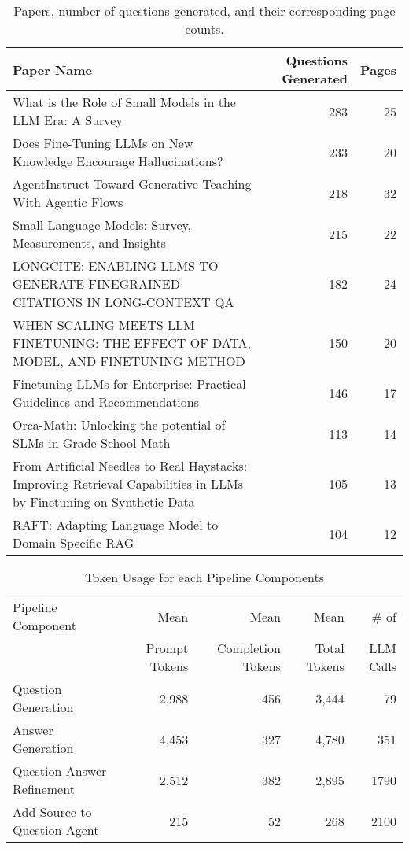 \begin{table}[t]
   \centering
   \caption{Papers, number of questions generated, and their corresponding page counts.}
   \label{tab:questions_and_pages}
   \begin{tabular}{p{8cm} r r}
   \toprule
   \textbf{Paper Name} & \textbf{Questions Generated} & \textbf{Pages} \\
   \midrule
   What is the Role of Small Models in the LLM Era: A Survey & 283 & 25 \\
   Does Fine-Tuning LLMs on New Knowledge Encourage Hallucinations? & 233 & 20 \\
   AgentInstruct Toward Generative Teaching With Agentic Flows & 218 & 32 \\
   Small Language Models: Survey, Measurements, and Insights & 215 & 22 \\
   LONGCITE: ENABLING LLMS TO GENERATE FINEGRAINED CITATIONS IN LONG-CONTEXT QA & 182 & 24 \\
   WHEN SCALING MEETS LLM FINETUNING: THE EFFECT OF DATA, MODEL, AND FINETUNING METHOD & 150 & 20 \\
   Finetuning LLMs for Enterprise: Practical Guidelines and Recommendations & 146 & 17 \\
   Orca-Math: Unlocking the potential of SLMs in Grade School Math & 113 & 14 \\
   From Artificial Needles to Real Haystacks: Improving Retrieval Capabilities in LLMs by Finetuning on Synthetic Data & 105 & 13 \\
   RAFT: Adapting Language Model to Domain Specific RAG & 104 & 12 \\
   \bottomrule
   \end{tabular}
\end{table}

\begin{table}[t]
   \centering
   \caption{Token Usage for each Pipeline Components}
   \label{tab:pipeline_tokens}
   \small
   \begin{tabular}{l r r r r}
   \toprule
   Pipeline Component & Mean & Mean & Mean & \# of \\
   & Prompt Tokens & Completion Tokens & Total Tokens & LLM Calls \\
   \midrule
   Question Generation & 2,988 & 456 & 3,444 & 79 \\
   Answer Generation & 4,453 & 327 & 4,780 & 351 \\
   Question Answer Refinement & 2,512 & 382 & 2,895 & 1790 \\
   Add Source to Question Agent & 215 & 52 & 268 & 2100 \\
   \bottomrule
   \end{tabular}
\end{table}
